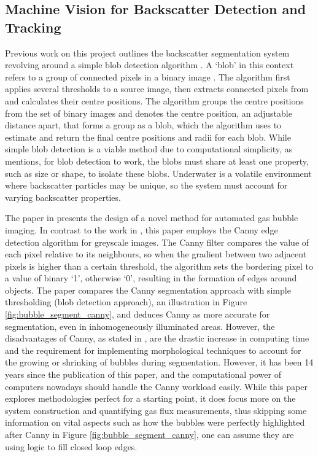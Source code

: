 \subsection{Machine Vision for Backscatter Detection and Tracking}
\label{bi_mv}
Previous work on this project \cite{katieshepherdMachineVisionBased2023} outlines the backscatter segmentation system revolving around a simple blob detection algorithm \cite{opencvOpenCVCvSimpleBlobDetector}. A `blob' in this context refers to a group of connected pixels in a binary image \cite{theodoreWhatExactlyBlob}. The algorithm first applies several thresholds to a source image, then extracts connected pixels from and calculates their centre positions. The algorithm groups the centre positions from the set of binary images and denotes the centre position, an adjustable distance apart, that forms a group as a blob, which the algorithm uses to estimate and return the final centre positions and radii for each blob. While simple blob detection is a viable method due to computational simplicity, as \cite{katieshepherdMachineVisionBased2023} mentions, for blob detection to work, the blobs must share at least one property, such as size or shape, to isolate these blobs. Underwater is a volatile environment where backscatter particles may be unique, so the system must account for varying backscatter properties.

The paper in \cite{thomanekAutomatedGasBubble2010} presents the design of a novel method for automated gas bubble imaging. In contrast to the work in \cite{katieshepherdMachineVisionBased2023}, this paper employs the Canny edge detection algorithm \cite{cannyComputationalApproachEdge1986} for greyscale images. The Canny filter compares the value of each pixel relative to its neighbours, so when the gradient between two adjacent pixels is higher than a certain threshold, the algorithm sets the bordering pixel to a value of binary `1', otherwise `0', resulting in the formation of edges around objects. The paper compares the Canny segmentation approach with simple thresholding (blob detection approach), an illustration in Figure \ref{fig:bubble_segment_canny}, and deduces Canny as more accurate for segmentation, even in inhomogeneously illuminated areas. However, the disadvantages of Canny, as stated in \cite{thomanekAutomatedGasBubble2010}, are the drastic increase in computing time and the requirement for implementing morphological techniques to account for the growing or shrinking of bubbles during segmentation. However, it has been 14 years since the publication of this paper, and the computational power of computers nowadays should handle the Canny workload easily. While this paper explores methodologies perfect for a starting point, it does focus more on the system construction and quantifying gas flux measurements, thus skipping some information on vital aspects such as how the bubbles were perfectly highlighted after Canny in Figure \ref{fig:bubble_segment_canny}, one can assume they are using logic to fill closed loop edges.

